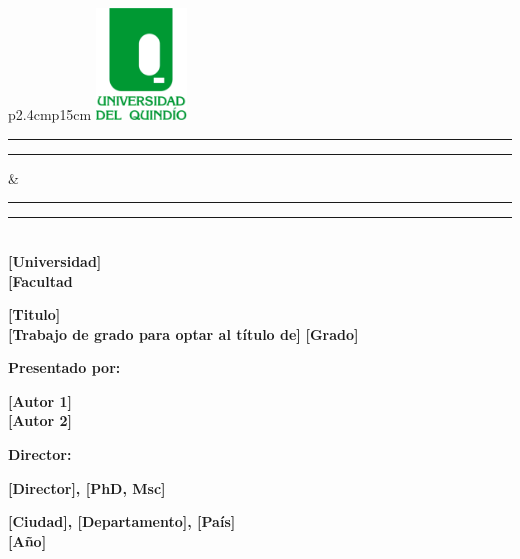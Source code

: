 {
\thispagestyle{empty}

\begin{center}
\begin{table}[!htb]
\begin{tabular}{p{2.4cm}p{15cm}}
\includegraphics[width=2.4cm]{images/logoUQ.png}
\begin{center}
\vspace{0.5cm}
\rule[2cm]{0.8mm}{ 0.95\textheight}%
\hspace{1pt}
\rule[2cm]{0.4mm}{0.95\textheight}%
\end{center}
&
\vspace{-3.5cm}
\begin{center}
\rule[1mm]{0.95\linewidth}{0.4mm}%
\vspace{0.1pt}
\rule[3mm]{0.95\linewidth}{0.8mm}%
\\
\vspace*{0.3cm}
\LARGE{\bf{[Universidad]}}\\
\vspace*{0.3cm}
\large{\bf{[Facultad}}

\vspace{3\baselineskip}
{\Large \bf{[Titulo]}}\\
\vspace*{0.2cm}
\vspace*{1.6cm}
\Large{\bf [Trabajo de grado para optar al título de] }
\Large{\bf [Grado] }


\vspace*{1.5cm}
{\large \bf{Presentado por:}}

\vspace*{0.5cm}
{ \bf{[Autor 1]}}\\
{ \bf{[Autor 2]}}

\vspace*{1.5cm}
{\large \bf{Director:}}

\vspace*{0.5cm}
{ \bf{[Director], [PhD, Msc]}}\\



\vspace*{3cm}

{\large \bf{[Ciudad], [Departamento], [País]}}\\
\vspace*{-0.1cm}
{\large \bf{[Año]}}
\end{center}
\end{tabular}
\end{table}
\end{center}
}